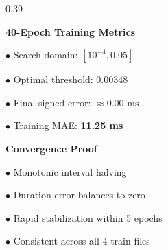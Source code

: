 \documentclass[aspectratio=169, 10pt]{beamer}
\begin{document}
\begin{frame}
\begin{tcolorbox}[contentframe]
\begin{columns}[c]
    \begin{column}{0.39\textwidth}
      \begin{tcolorbox}[glowcard, height=2.42cm, valign=top, top=5pt, bottom=5pt, left=8pt, right=8pt, boxsep=0pt]
        {\fontsize{8.2pt}{9.5pt}\selectfont\color{cyanGlow}\textbf{40-Epoch Training Metrics}\par}
        \vspace{3pt}
        {\fontsize{7.2pt}{8.6pt}\selectfont
        $\bullet$ Search domain: $[10^{-4}, 0.05]$\par\vspace{1.5pt}
        $\bullet$ Optimal threshold: $\mathbf{0.00348}$\par\vspace{1.5pt}
        $\bullet$ Final signed error: $\approx 0.00\text{ ms}$\par\vspace{1.5pt}
        $\bullet$ Training MAE: \textbf{11.25 ms}\par}
      \end{tcolorbox}
      \vskip0.18cm
      \begin{tcolorbox}[mintcard, height=2.42cm, valign=top, top=5pt, bottom=5pt, left=8pt, right=8pt, boxsep=0pt]
        {\fontsize{8.2pt}{9.5pt}\selectfont\color{mintGreen}\textbf{Convergence Proof}\par}
        \vspace{3pt}
        {\fontsize{7.2pt}{8.6pt}\selectfont
        $\bullet$ Monotonic interval halving\par\vspace{1.5pt}
        $\bullet$ Duration error balances to zero\par\vspace{1.5pt}
        $\bullet$ Rapid stabilization within 5 epochs\par\vspace{1.5pt}
        $\bullet$ Consistent across all 4 train files\par}
      \end{tcolorbox}
    \end{column}
  \end{columns}
  \end{tcolorbox}
\end{frame}

\end{document}
